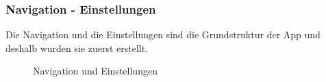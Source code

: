 \subsubsection{Navigation - Einstellungen}\label{mockup_navigation_settings}
Die Navigation und die Einstellungen sind die Grundstruktur der App und deshalb wurden sie zuerst erstellt.
\begin{figure}[ht]
\centering
{}
\label{fig:mockup_setting}
\caption{Navigation und Einstellungen}
\end{figure}

